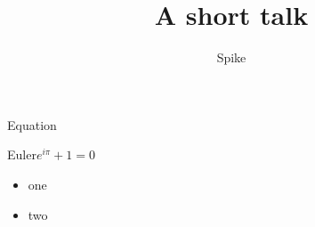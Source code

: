 \documentclass{beamer}
\title{A short talk}\author{Spike}
\begin{document}
\begin{frame}\titlepage\end{frame}
\begin{frame}{Equation}
\begin{block}{Euler}$e^{i\pi}+1=0$\end{block}
\begin{itemize}\item<1-> one \item<2-> two\end{itemize}
\end{frame}
\end{document}
